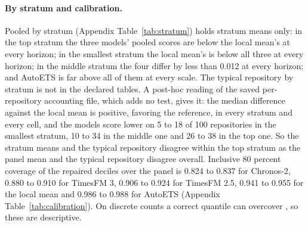 \paragraph{By stratum and calibration.} Pooled \qs{} by stratum (Appendix Table~\ref{tab:stratum}) holds
stratum means only: in the top stratum the three models' pooled scores are below the local mean's at every
horizon; in the smallest stratum the local mean's is below all three at every horizon; in the middle stratum
the four differ by less than 0.012 at every horizon; and AutoETS is far above all of them at every scale. The
typical repository by stratum is not in the declared tables. A post-hoc reading of the saved per-repository
accounting file, which adds no test, gives it: the median difference against the local mean is positive,
favoring the reference, in every stratum and every cell, and the models score lower on 5 to 18 of 100
repositories in the smallest stratum, 10 to 34 in the middle one and 26 to 38 in the top one. So the stratum
means and the typical repository disagree within the top stratum as the panel mean and the typical repository
disagree overall. Inclusive 80 percent coverage of the repaired deciles over the panel is 0.824 to 0.837 for
Chronos-2, 0.880 to 0.910 for TimesFM 3, 0.906 to 0.924 for TimesFM 2.5, 0.941 to 0.955 for the local mean
and 0.986 to 0.988 for AutoETS (Appendix Table~\ref{tab:calibration}). On discrete counts a correct quantile
can overcover \citep{czado2009}, so these are descriptive.
